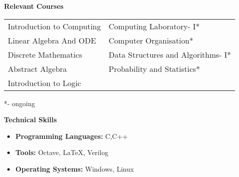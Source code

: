 \documentclass[12pt]{article}
\begin{document}
\begin{adjustwidth}{-3.4cm}{-0.5cm}
\begin{flushleft}
\begin{large}
 \textbf{Relevant Courses} \linebreak
 \end{large} 

\begin{tabular}{l@{\hskip 2in} l}
Introduction to Computing & Computing Laboratory- I*\\
Linear Algebra And ODE & Computer Organisation*\\
Discrete Mathematics & Data Structures and Algorithms- I*\\
Abstract Algebra & Probability and Statistics* \\
Introduction to Logic 
\end{tabular}

*- ongoing \linebreak \linebreak
\begin{large}
 \textbf{Technical Skills}
 \end{large} 

\begin{itemize}
\item \textbf{Programming Languages:} C,C++
\item \textbf{Tools:} Octave, \LaTeX, Verilog
\item \textbf{Operating Systems:} Windows, Linux
\end{itemize}
\end{flushleft}

\end{adjustwidth}
\end{document}
